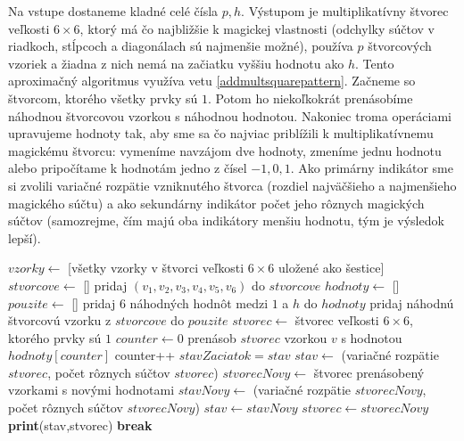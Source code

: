 \begin{alg}
\label{algsquare6x6mm}
Na vstupe dostaneme kladné celé čísla $p, h$. Výstupom je multiplikatívny štvorec veľkosti $6 \times 6$, ktorý má čo najbližšie k magickej vlastnosti (odchylky súčtov v riadkoch, stĺpcoch a diagonálach sú najmenšie možné), používa $p$ štvorcových vzoriek a žiadna z nich nemá na začiatku vyššiu hodnotu ako $h$. Tento aproximačný algoritmus využíva vetu \ref{addmultsquarepattern}. Začneme so štvorcom, ktorého všetky prvky sú $1$. Potom ho niekoľkokrát prenásobíme náhodnou štvorcovou vzorkou s náhodnou hodnotou. Nakoniec troma operáciami upravujeme hodnoty tak, aby sme sa čo najviac priblížili k multiplikatívnemu magickému štvorcu: vymeníme navzájom dve hodnoty, zmeníme jednu hodnotu alebo pripočítame k hodnotám jedno z čísel $-1, 0, 1$. Ako primárny indikátor sme si zvolili variačné rozpätie vzniknutého štvorca (rozdiel najväčšieho a najmenšieho magického súčtu) a ako sekundárny indikátor počet jeho rôznych magických súčtov (samozrejme, čím majú oba indikátory menšiu hodnotu, tým je výsledok lepší).
\end{alg}

\begin{algorithmic}
\STATE $vzorky \gets$ [všetky vzorky v štvorci veľkosti $6 \times 6$ uložené ako šestice]
\STATE $stvorcove \gets $ []
	\STATE pridaj $(v_1,v_2,v_3,v_4,v_5,v_6)$ do $stvorcove$
    \ENDIF
\ENDFOR
{}
	\STATE $hodnoty \gets$ []
	\STATE $pouzite \gets$ []
		\STATE pridaj $6$ náhodných hodnôt medzi $1$ a $h$ do $hodnoty$
		\STATE pridaj náhodnú štvorcovú vzorku z $stvorcove$ do $pouzite$
	\ENDFOR
		\STATE $stvorec \gets$ štvorec veľkosti $6 \times 6$, ktorého prvky sú $1$
		\STATE $counter \gets 0$
				\STATE prenásob $stvorec$ vzorkou $v$ s hodnotou $hodnoty[counter]$
				\STATE counter++
			\ENDFOR
		\ENDFOR
			\STATE $stavZaciatok = stav$
			\STATE $stav \gets$ (variačné rozpätie $stvorec$, počet rôznych súčtov $stvorec$)
				\STATE $stvorecNovy \gets$ štvorec prenásobený vzorkami s novými hodnotami
				\STATE $stavNovy \gets$ (variačné rozpätie $stvorecNovy$, počet rôznych súčtov $stvorecNovy$)
					\STATE $stav \gets stavNovy$
					\STATE $stvorec \gets stvorecNovy$
				\ENDIF
			\ENDFOR
				\STATE \textbf{print}(stav,stvorec)
				\STATE \textbf{break}
			\ENDIF
		\ENDIF
	\ENDWHILE
\ENDWHILE
\end{algorithmic}

